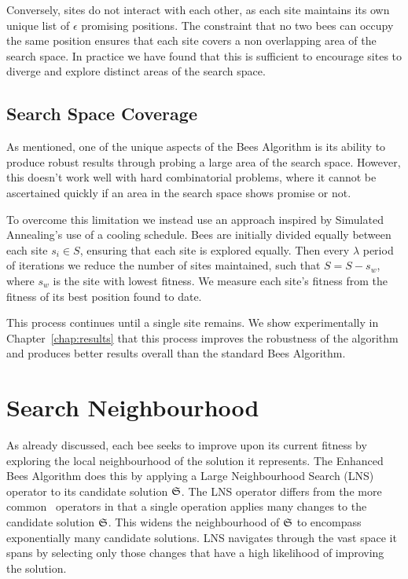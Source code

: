Conversely, sites do not interact with each other, as each site maintains its own unique list of $\epsilon$ promising positions. The constraint that no two bees can occupy the same position ensures that each site covers a non overlapping area of the search space. In practice we have found that this is sufficient to encourage sites to diverge and explore distinct areas of the search space.    


\subsection{Search Space Coverage}
\label{subsec:searchspacecoverage}

As mentioned, one of the unique aspects of the Bees Algorithm is its ability to produce robust results through probing a large area of the search space. However, this doesn't work well with hard combinatorial problems, where it cannot be ascertained quickly if an area in the search space shows promise or not. 

To overcome this limitation we instead use an approach inspired by Simulated Annealing's use of a cooling schedule. Bees are initially divided equally between each site $s_i \in S$, ensuring that each site is explored equally. Then every $\lambda$ period of iterations we reduce the number of sites maintained, such that $S = S - s_w$, where $s_w$ is the site with lowest fitness. We measure each site's fitness from the fitness of its best position found to date.

This process continues until a single site remains. We show experimentally in Chapter~\ref{chap:results} that this process improves the robustness of the algorithm and produces better results overall than the standard Bees Algorithm. 

\section{Search Neighbourhood}
\label{sec:searchneighbourhood}

As already discussed, each bee seeks to improve upon its current fitness by exploring the local neighbourhood of the solution it represents. The Enhanced Bees Algorithm does this by applying a Large Neighbourhood Search (LNS) operator to its candidate solution $\mathfrak{S}$. The LNS operator differs from the more common \VRP\ operators in that a single operation applies many changes to the candidate solution $\mathfrak{S}$. This widens the neighbourhood of $\mathfrak{S}$ to encompass exponentially many candidate solutions. LNS navigates through the vast space it spans by selecting only those changes that have a high likelihood of improving the solution.

